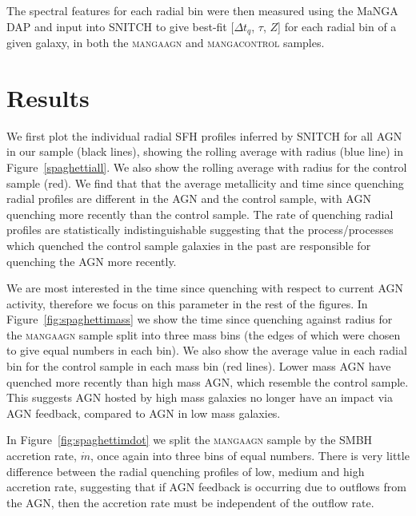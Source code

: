 \documentclass[useAMS,usenatbib]{mn2e}
\begin{document}
The spectral features for each radial bin were then measured using the MaNGA DAP and input into SNITCH to give best-fit [$\Delta t_q$, $\tau$, $Z$] for each radial bin of a given galaxy, in both the \textsc{mangaagn} and \textsc{mangacontrol} samples.


\section{Results}\label{sec:results}

We first plot the individual radial SFH profiles inferred by SNITCH for all AGN in our sample (black lines), showing the rolling average with radius (blue line) in Figure~\ref{spaghettiall}. We also show the rolling average with radius for the control sample (red). We find that that the average metallicity and time since quenching radial profiles are different in the AGN and the control sample, with AGN quenching more recently than the control sample. The rate of quenching radial profiles are statistically indistinguishable suggesting that the process/processes which quenched the control sample galaxies in the past are responsible for quenching the AGN more recently.

We are most interested in the time since quenching with respect to current AGN activity, therefore we focus on this parameter in the rest of the figures. In Figure~\ref{fig:spaghettimass} we show the time since quenching against radius for the \textsc{mangaagn} sample split into three mass bins (the edges of which were chosen to give equal numbers in each bin). We also show the average value in each radial bin for the control sample in each mass bin (red lines). Lower mass AGN have quenched more recently than high mass AGN, which resemble the control sample. This suggests AGN hosted by high mass galaxies no longer have an impact via AGN feedback, compared to AGN in low mass galaxies. 

In Figure~\ref{fig:spaghettimdot} we split the \textsc{mangaagn} sample by the SMBH accretion rate, $\dot{m}$, once again into three bins of equal numbers. There is very little difference between the radial quenching profiles of low, medium and high accretion rate, suggesting that if AGN feedback is occurring due to outflows from the AGN, then the accretion rate must be independent of the outflow rate.
\end{document}
